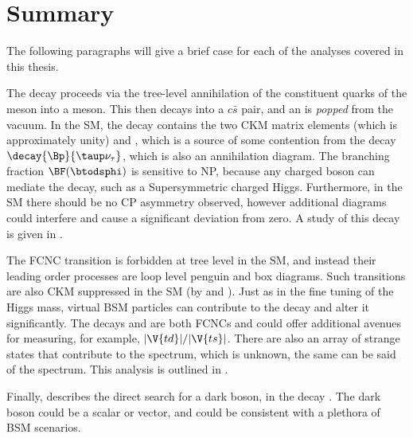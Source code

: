 \section{Summary}

The following paragraphs will give a brief case for each of the analyses covered in this thesis.

The decay \btodsphi proceeds via the tree-level annihilation of the constituent quarks of the \Bp
meson into a \Wp meson.
This then decays into a $c\bar s$ pair, and an \ssbar is \emph{popped} from the vacuum.
In the SM, the decay contains the two CKM matrix elements  (which is approximately unity) and
, which is a source of some contention from the decay $\decay{\Bp}{\taup\nu_\tau}$, which
is also an annihilation diagram.
The branching fraction $\BF(\btodsphi)$ is sensitive to NP, because any charged boson can mediate
the decay, such as a Supersymmetric charged Higgs.
Furthermore, in the SM there should be no CP asymmetry observed, however additional diagrams could
interfere and cause a significant deviation from zero.
A study of this decay is given in .

The FCNC transition  is forbidden at tree level in the SM, and instead their
leading order processes are loop level penguin and box diagrams.
Such transitions are also CKM suppressed in the SM (by  and ).
Just as in the fine tuning of the Higgs mass, virtual BSM particles can contribute to the decay and
alter it significantly.
The decays \btokpipimumu and \btophikmumu are both  FCNCs and could offer
additional avenues for measuring, for example, $|\V{td}|/|\V{ts}|$.
There are also an array of strange states that contribute to the \kpipi spectrum, which is unknown,
the same can be said of the \phik spectrum.
This analysis is outlined in .

Finally,  describes the direct search for a dark boson, \decay{\db}{\mumu} in the
decay \decay{\Bd}{\Kstarent\mumu}.
The dark boson could be a scalar or vector, and could be consistent with a plethora of BSM
scenarios.












